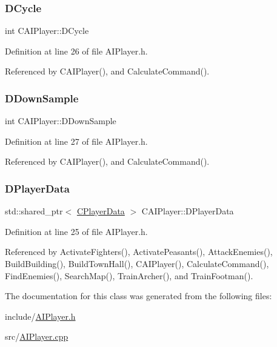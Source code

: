 \subsubsection{\texorpdfstring{D\+Cycle}{DCycle}}
{\footnotesize\ttfamily int C\+A\+I\+Player\+::\+D\+Cycle\hspace{0.3cm}{\ttfamily [protected]}}



Definition at line 26 of file A\+I\+Player.\+h.



Referenced by C\+A\+I\+Player(), and Calculate\+Command().

\hypertarget{classCAIPlayer_a091aed92cb9ad1a789900a6394d2f352}{}\label{classCAIPlayer_a091aed92cb9ad1a789900a6394d2f352} 
\subsubsection{\texorpdfstring{D\+Down\+Sample}{DDownSample}}
{\footnotesize\ttfamily int C\+A\+I\+Player\+::\+D\+Down\+Sample\hspace{0.3cm}{\ttfamily [protected]}}



Definition at line 27 of file A\+I\+Player.\+h.



Referenced by C\+A\+I\+Player(), and Calculate\+Command().

\hypertarget{classCAIPlayer_a83b5113c8f7e80df54940b647c5ee2e6}{}\label{classCAIPlayer_a83b5113c8f7e80df54940b647c5ee2e6} 
\subsubsection{\texorpdfstring{D\+Player\+Data}{DPlayerData}}
{\footnotesize\ttfamily std\+::shared\+\_\+ptr$<$ \hyperlink{classCPlayerData}{C\+Player\+Data} $>$ C\+A\+I\+Player\+::\+D\+Player\+Data\hspace{0.3cm}{\ttfamily [protected]}}



Definition at line 25 of file A\+I\+Player.\+h.



Referenced by Activate\+Fighters(), Activate\+Peasants(), Attack\+Enemies(), Build\+Building(), Build\+Town\+Hall(), C\+A\+I\+Player(), Calculate\+Command(), Find\+Enemies(), Search\+Map(), Train\+Archer(), and Train\+Footman().



The documentation for this class was generated from the following files\+:\begin{DoxyCompactItemize}
\item 
include/\hyperlink{AIPlayer_8h}{A\+I\+Player.\+h}\item 
src/\hyperlink{AIPlayer_8cpp}{A\+I\+Player.\+cpp}\end{DoxyCompactItemize}
